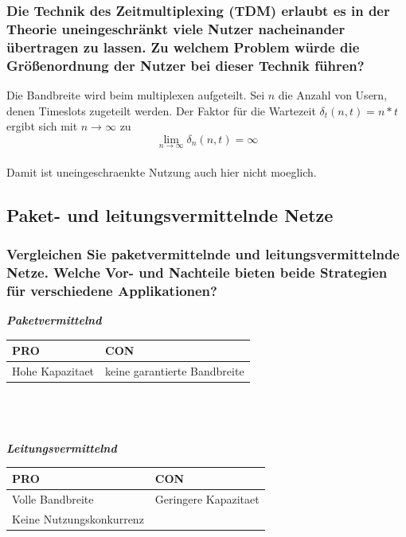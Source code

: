 \documentclass{article}
\newcommand{\gap}{\\ \ \\}
\newcommand{\headline}[1]{\textbf{\textit{#1}}\\}
\begin{document}
\subsubsection{
    Die Technik des Zeitmultiplexing (TDM) erlaubt es in der Theorie
    uneingeschränkt viele Nutzer nacheinander übertragen zu lassen. 
    Zu welchem Problem würde die Größenordnung der Nutzer bei 
    dieser Technik führen?
}
Die Bandbreite wird beim multiplexen aufgeteilt. 
Sei $n$ die Anzahl von Usern, denen Timeslots zugeteilt werden. 
Der Faktor für die Wartezeit $\delta_t(n, t) = n * t$
ergibt sich mit $n \to \infty$ zu
$$
\lim_{n \to \infty} \delta_n(n, t) = \infty
$$\\
Damit ist uneingeschraenkte Nutzung auch hier nicht moeglich.\\

\subsection{Paket- und leitungsvermittelnde Netze}

\subsubsection{
    Vergleichen Sie paketvermittelnde und leitungsvermittelnde Netze.
    Welche Vor- und Nachteile bieten beide Strategien für 
    verschiedene Applikationen?
}
\headline{Paketvermittelnd}
\begin{tabular}{l|l}
    PRO & CON\\
    \hline
    Hohe Kapazitaet&
        keine garantierte Bandbreite\\
\end{tabular}\\
\gap
\headline{Leitungsvermittelnd}
\begin{tabular}{l|l}
    PRO & CON\\
    \hline
    Volle Bandbreite&
        Geringere Kapazitaet\\
    Keine Nutzungskonkurrenz&
        \\
\end{tabular}\\
\end{document}
